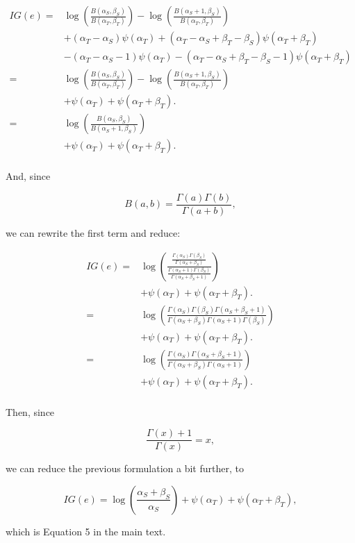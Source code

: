 \documentclass[12pt]{article}
\begin{document}
\begin{equation}
\begin{split}
IG(e)  = & \log( \frac{B(\alpha_{S},\beta_{S})}{B(\alpha_{T},\beta_{T})}) - \log( \frac{B(\alpha_{S}+1,\beta_{S})}{B(\alpha_{T},\beta_{T})}) \\ 
& + (\alpha_T - \alpha_S) \psi (\alpha_T) +  (\alpha_T - \alpha_S + \beta_T - \beta_S) \psi (\alpha_T + \beta_T)  \\
& - (\alpha_T - \alpha_{S} - 1) \psi (\alpha_T) - (\alpha_T - \alpha_{S} + \beta_T - \beta_{S} - 1) \psi (\alpha_T + \beta_T) \\
= & \log( \frac{B(\alpha_{S},\beta_{S})}{B(\alpha_{T},\beta_{T})})   - \log( \frac{B(\alpha_{S}+1,\beta_{S})}{B(\alpha_{T},\beta_{T})}) \\ 
& + \psi (\alpha_T) + \psi (\alpha_T + \beta_T). \\
= & \log( \frac{B(\alpha_{S},\beta_{S})}{B(\alpha_{S}+1,\beta_{S})})   \\
& + \psi (\alpha_T) + \psi (\alpha_T + \beta_T). \\
\end{split}
\end{equation}

\noindent And, since 

\begin{equation}
B(a,b) = \frac{\Gamma(a)\Gamma(b)}{\Gamma(a+b)},
\end{equation}

\noindent we can rewrite the first term and reduce:

\begin{equation}
\begin{split}
IG(e) = & \log( \frac{\frac{\Gamma(\alpha_S)\Gamma(\beta_S)}{\Gamma(\alpha_S+\beta_S)}}{\frac{\Gamma(\alpha_S + 1)\Gamma(\beta_S)}{\Gamma(\alpha_S+\beta_S + 1)}})   \\
& + \psi (\alpha_T) + \psi (\alpha_T + \beta_T). \\
=& \log( \frac{\Gamma(\alpha_S)\Gamma(\beta_S) \Gamma(\alpha_S+\beta_S + 1)}{\Gamma(\alpha_S+\beta_S) \Gamma(\alpha_S + 1)\Gamma(\beta_S)})   \\
& + \psi (\alpha_T) + \psi (\alpha_T + \beta_T). \\
=& \log( \frac{\Gamma(\alpha_S) \Gamma(\alpha_S+\beta_S + 1)}{\Gamma(\alpha_S+\beta_S) \Gamma(\alpha_S + 1)})   \\
& + \psi (\alpha_T) + \psi (\alpha_T + \beta_T). \\
\end{split}
\end{equation}

\noindent Then, since 

\begin{equation}
\frac{\Gamma(x) + 1}{\Gamma(x)} = x,
\end{equation}

\noindent we can reduce the previous formulation a bit further, to

\begin{equation}
IG(e) = \log(\frac{\alpha_S + \beta_S}{\alpha_S}) + \psi (\alpha_T) + \psi (\alpha_T + \beta_T), 
\end{equation}

\noindent which is Equation 5 in the main text. 
\end{document}
